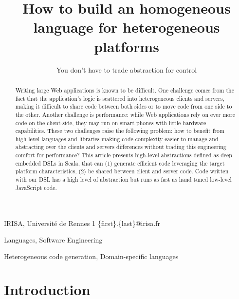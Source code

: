 \documentclass[preprint]{sigplanconf}
\begin{document}
\copyrightdata{[to be supplied]} 


\title{How to build an homogeneous language for heterogeneous platforms}
\subtitle{You don’t have to trade abstraction for control}

           {IRISA, Université de Rennes 1}
           {\{first\}.\{last\}@irisa.fr}

\maketitle

\begin{abstract}
Writing large Web applications is known to be difficult. One challenge comes from the fact that the application's
logic is scattered into heterogeneous clients and servers, making it difficult to share code between both sides or to
move code from one side to the other. Another challenge is performance: while Web applications rely on ever more
code on the client-side, they may run on smart phones with little hardware capabilities. These two challenges raise
the following problem: how to benefit from high-level languages and libraries making code complexity easier to manage
and abstracting over the clients and servers differences without trading this engineering comfort for performance?
This article presents high-level abstractions defined as deep embedded DSLs in Scala, that can (1) generate efficient
code leveraging the target platform characteristics, (2) be shared between client and server code. Code written with
our DSL has a high level of abstraction but runs as fast as hand tuned low-level JavaScript code.
\end{abstract}


\terms Languages, Software Engineering

\keywords Heterogeneous code generation, Domain-specific languages

\section{Introduction}
\end{document}
